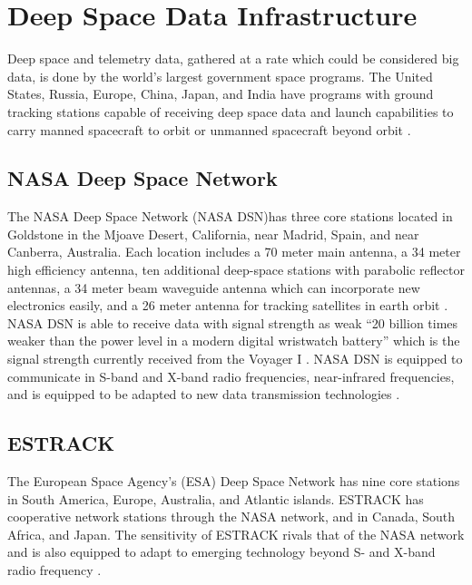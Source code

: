 \documentclass[sigconf]{acmart}
\begin{document}
\section{Deep Space Data Infrastructure}
Deep space and telemetry data, gathered at a rate which could be considered big data, is done by the world's largest government space programs. The United States, Russia, Europe, China, Japan, and India have programs with ground tracking stations capable of receiving deep space data and launch capabilities to carry manned spacecraft to orbit or unmanned spacecraft beyond orbit \cite{Imbriale2002}. 

\subsection{NASA Deep Space Network}
The NASA Deep Space Network (NASA DSN)has three core stations located in Goldstone in the Mjoave Desert, California, near Madrid, Spain, and near Canberra, Australia. Each location includes a 70 meter main antenna, a 34 meter high efficiency antenna,  ten additional deep-space stations with parabolic reflector antennas, a  34 meter beam waveguide antenna which can incorporate new electronics easily, and a 26 meter antenna for tracking satellites in earth orbit \cite{Imbriale2002}. NASA DSN is able to receive data with signal strength as weak ``20 billion times weaker than the power level in a modern digital wristwatch battery'' \cite{Facts2005} which is the signal strength currently received from the Voyager I \cite{Laboratory2017}. NASA DSN is equipped to communicate in S-band and X-band radio frequencies, near-infrared frequencies, and is equipped to be adapted to new data transmission technologies \cite{Facts2005}. 

\subsection{ESTRACK}
The European Space Agency's (ESA) Deep Space Network \cite{ERA2017} has nine core stations in South America, Europe, Australia, and Atlantic islands. ESTRACK has cooperative network stations through the NASA network, and in Canada, South Africa, and Japan. The sensitivity of ESTRACK rivals that of the NASA network and is also equipped to adapt to emerging technology beyond S- and X-band radio frequency \cite{ERA2017}. 
\end{document}
